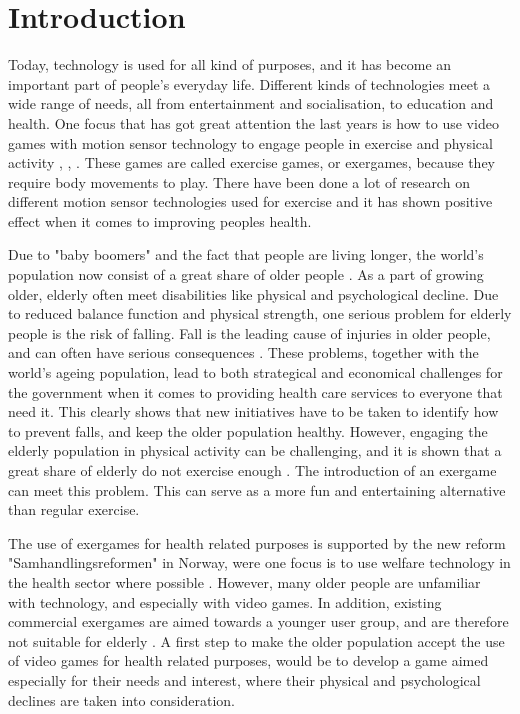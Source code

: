 \chapter{Introduction}

Today, technology is used for all kind of purposes, and it has become an important part of people's everyday life. Different kinds of technologies meet a wide range of needs, all from entertainment and socialisation, to education and health. One focus that has got great attention the last years is how to use video games with motion sensor technology to engage people in exercise and physical activity \cite{exergamesforelderly}, \cite{gerling1}, \cite{garcia2012exergames}. These games are called exercise games, or exergames, because they require body movements to play. There have been done a lot of research on different motion sensor technologies used for exercise and it has shown positive effect when it comes to improving peoples health. 

Due to "baby boomers" and the fact that people are living longer, the world's population now consist of a great share of older people \cite{dickinson2007methods}. As a part of growing older, elderly often meet disabilities like physical and psychological decline. Due to reduced balance function and physical strength, one serious problem for elderly people is the risk of falling. Fall is the leading cause of injuries in older people, and can often have serious consequences \cite{otago}. These problems, together with the world's ageing population, lead to both strategical and economical challenges for the government when it comes to providing health care services to everyone that need it. This clearly shows that new initiatives have to be taken to identify how to prevent falls, and keep the older population healthy. However, engaging the elderly population in physical activity can be challenging, and it is shown that a great share of elderly do not exercise enough \cite{statistikknorge12}. The introduction of an exergame can meet this problem. This can serve as a more fun and entertaining alternative than regular exercise.  

The use of exergames for health related purposes is supported by the new reform "Samhandlingsreformen" in Norway, were one focus is to use welfare technology in the health sector where possible \cite{welfare}. However, many older people are unfamiliar with technology, and especially with video games. In addition, existing commercial exergames are aimed towards a younger user group, and are therefore not suitable for elderly \cite{exergamesforelderly}. A first step to make the older population accept the use of video games for health related purposes, would be to develop a game aimed especially for their needs and interest, where their physical and psychological declines are taken into consideration. 

